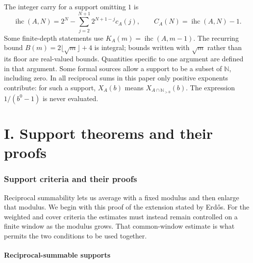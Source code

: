 \documentclass[11pt]{article}
\theoremstyle{plain}
\theoremstyle{definition}
\theoremstyle{remark}
\newcommand{\N}{\mathbb{N}}
\newcommand{\Npos}{\mathbb{N}_{>0}}
\begin{document}
The integer carry for a support omitting $1$ is
\[
 \operatorname{ihc}(A,N)=2^N-
 \sum_{j=2}^{N+1}2^{N+1-j}c_A(j),\qquad
 C_A(N)=\operatorname{ihc}(A,N)-1.
\]
Some finite-depth statements use $K_A(m)=\operatorname{ihc}(A,m-1)$.
The recurring bound $B(m)=2\lfloor\sqrt m\rfloor+4$ is integral; bounds
written with $\sqrt m$ rather than its floor are real-valued bounds.
Quantities specific to one argument are defined in that argument.
Some formal sources allow a support to be a subset of $\N$, including zero.
In all reciprocal sums in this paper only positive exponents contribute:
for such a support, $X_A(b)$ means $X_{A\cap\Npos}(b)$.  The expression
$1/(b^0-1)$ is never evaluated.

\clearpage
\tableofcontents
\clearpage
%

\clearpage
\part*{I. Support theorems and their proofs}
\section{Support criteria and their proofs}
\label{sec:257-problem}
Reciprocal summability lets us average with a fixed modulus and then
enlarge that modulus. We begin with this proof of the extension stated
by Erd\H{o}s. For the weighted and cover criteria the estimates must
instead remain controlled on a finite window as the modulus grows.
That common-window estimate is what permits the two conditions to be
used together.


\subsection{Reciprocal-summable supports}
\end{document}
